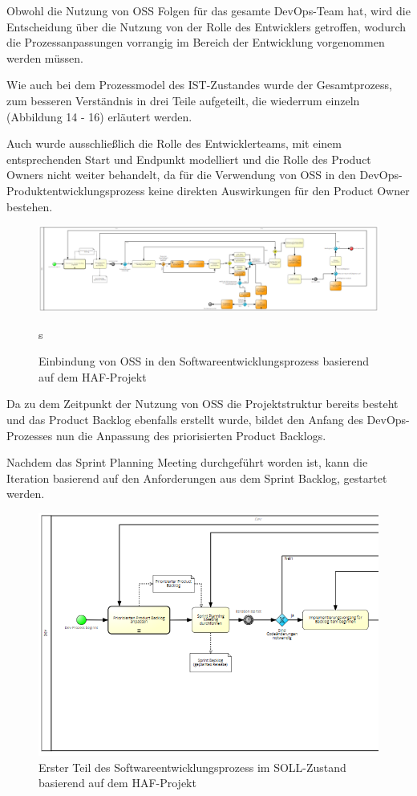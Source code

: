 Obwohl die Nutzung von OSS Folgen für das gesamte DevOps-Team hat, wird die Entscheidung über die Nutzung von der Rolle des Entwicklers getroffen, wodurch die Prozessanpassungen vorrangig im Bereich der Entwicklung vorgenommen werden müssen. 

Wie auch bei dem Prozessmodel des IST-Zustandes wurde der Gesamtprozess, zum besseren Verständnis in drei Teile aufgeteilt, die wiederrum einzeln (Abbildung 14 - 16) erläutert werden. 

Auch wurde ausschließlich die Rolle des Entwicklerteams, mit einem entsprechenden Start und Endpunkt modelliert und die Rolle des Product Owners nicht weiter behandelt, da für die Verwendung von OSS in den DevOps-Produktentwicklungsprozess keine direkten Auswirkungen für den Product Owner bestehen.

\begin{figure}[p]
    \centering
    \includegraphics[angle=90, scale=0.5]{Bilder/SOLL-Prozess.png}
    \caption{Einbindung von OSS in den Softwareentwicklungsprozess basierend auf dem HAF-Projekt}s
\end{figure}

Da zu dem Zeitpunkt der Nutzung von OSS die Projektstruktur bereits besteht und das Product Backlog ebenfalls erstellt wurde, bildet den Anfang des DevOps-Prozesses nun die Anpassung des priorisierten Product Backlogs.

Nachdem das Sprint Planning Meeting durchgeführt worden ist, kann die Iteration basierend auf den Anforderungen aus dem Sprint Backlog, gestartet werden.\\ 

\begin{figure}[h]
    \centering
    \includegraphics[scale=0.5]{Bilder/SOLL-Prozess_first Part.png}
    \caption{Erster Teil des Softwareentwicklungsprozess im SOLL-Zustand basierend auf dem HAF-Projekt}
\end{figure}

